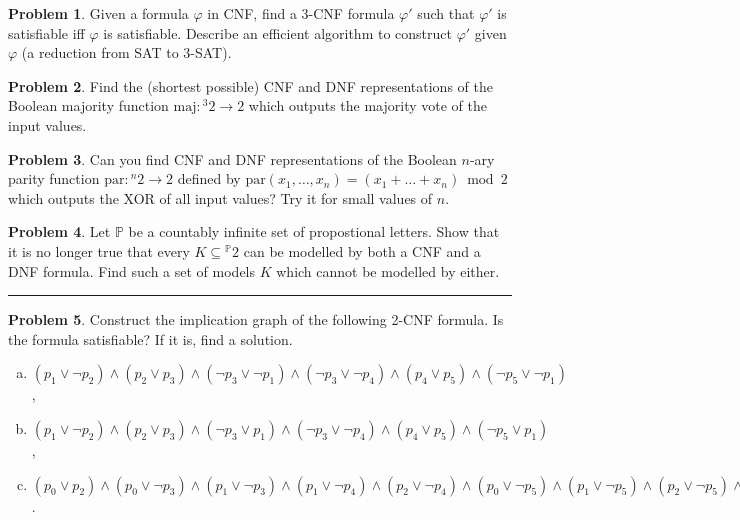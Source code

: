 \documentclass{amsart}
\theoremstyle{definition}
\newtheorem{problem}{Problem}
\begin{document}
\bigskip\begin{problem} Given a formula $\varphi$ in CNF, find a 3-CNF formula $\varphi'$ such that $\varphi'$ is satisfiable iff $\varphi$ is satisfiable. Describe an efficient algorithm to construct $\varphi'$ given $\varphi$ (a reduction from SAT to 3-SAT).
\end{problem}


\bigskip\begin{problem} Find the (shortest possible) CNF and DNF representations of the Boolean majority function $\mathrm{maj}: {^3}2\to 2$ which outputs the majority vote of the input values.
\end{problem}


\bigskip\begin{problem} Can you find CNF and DNF representations of the Boolean $n$-ary parity function $\mathrm{par}: {^n}2\to 2$ defined by $\mathrm{par}(x_1,\dots,x_n)=(x_1+\dots+x_n)\bmod 2$
which outputs the XOR of all input values? Try it for small values of $n$.
\end{problem}

\bigskip\begin{problem} Let $\mathbb P$ be a countably infinite set of propostional letters. Show that it is no longer true that every $K\subseteq {^\mathbb P}2$ can be modelled by both a CNF and a DNF formula. Find such a set of models $K$ which cannot be modelled by either.
\end{problem}


\hrule


\bigskip\begin{problem} Construct the implication graph of the following 2-CNF formula. Is the formula satisfiable? If it is, find a solution.
\begin{enumerate}[a)]
\item $(p_1\vee \neg p_2)\wedge (p_2\vee p_3)\wedge (\neg p_3\vee \neg p_1)\wedge (\neg p_3\vee \neg p_4)\wedge (p_4\vee p_5)\wedge (\neg p_5\vee \neg p_1)$,
\item $(p_1\vee \neg p_2)\wedge (p_2\vee p_3)\wedge (\neg p_3\vee p_1)\wedge (\neg p_3\vee \neg p_4)\wedge (p_4\vee p_5)\wedge (\neg p_5\vee p_1)$,
\item $(p_0 \vee  p_2) \wedge  (p_0 \vee  \neg p_3) \wedge  (p_1 \vee  \neg p_3) 
\wedge  (p_1 \vee  \neg p_4) \wedge  (p_2 \vee  \neg p_4) 
\wedge  (p_0 \vee  \neg p_5)
\wedge 
(p_1 \vee  \neg p_5) \wedge  (p_2 \vee  \neg p_5) \wedge  (\neg p_1 \vee  \neg p_6) \wedge  (p_4 \vee  p_6) \wedge  (p_5 \vee  p_6) \wedge  p_1\wedge \neg p_7$.
\end{enumerate}
\end{problem}
\end{document}
